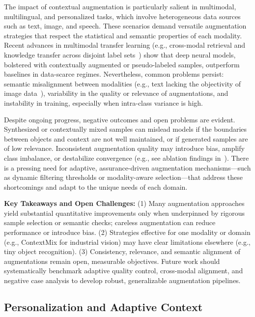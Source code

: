 \documentclass[sigconf]{acmart}
\begin{document}
The impact of contextual augmentation is particularly salient in multimodal, multilingual, and personalized tasks, which involve heterogeneous data sources such as text, image, and speech. These scenarios demand versatile augmentation strategies that respect the statistical and semantic properties of each modality. Recent advances in multimodal transfer learning (e.g., cross-modal retrieval and knowledge transfer across disjoint label sets~\cite{ref14,ref15,ref19,ref20,ref23,ref24,ref28,ref29,ref30,ref31,ref33,ref36,ref37,ref38,ref39,ref43,ref45,ref48,ref54,ref55,ref61,ref62}) show that deep neural models, bolstered with contextually augmented or pseudo-labeled samples, outperform baselines in data-scarce regimes. Nevertheless, common problems persist: semantic misalignment between modalities (e.g., text lacking the objectivity of image data~\cite{ref20}), variability in the quality or relevance of augmentations, and instability in training, especially when intra-class variance is high.

Despite ongoing progress, negative outcomes and open problems are evident. Synthesized or contextually mixed samples can mislead models if the boundaries between objects and context are not well maintained, or if generated samples are of low relevance. Inconsistent augmentation quality may introduce bias, amplify class imbalance, or destabilize convergence (e.g., see ablation findings in~\cite{ref60,ref61}). There is a pressing need for adaptive, assurance-driven augmentation mechanisms—such as dynamic filtering thresholds or modality-aware selection—that address these shortcomings and adapt to the unique needs of each domain.

\textbf{Key Takeaways and Open Challenges:} (1) Many augmentation approaches yield substantial quantitative improvements only when underpinned by rigorous sample selection or semantic checks; careless augmentation can reduce performance or introduce bias. (2) Strategies effective for one modality or domain (e.g., ContextMix for industrial vision) may have clear limitations elsewhere (e.g., tiny object recognition). (3) Consistency, relevance, and semantic alignment of augmentations remain open, measurable objectives. Future work should systematically benchmark adaptive quality control, cross-modal alignment, and negative case analysis to develop robust, generalizable augmentation pipelines.

\subsection{Personalization and Adaptive Context}
\end{document}
